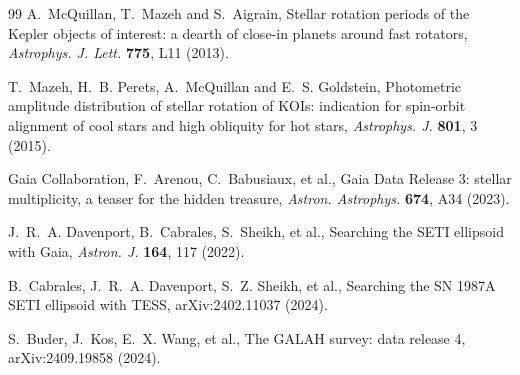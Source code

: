 \documentclass[3p,11pt]{elsarticle}
\begin{document}
\begin{thebibliography}{99}
A.~McQuillan, T.~Mazeh and S.~Aigrain, Stellar rotation periods of the Kepler objects of
interest: a dearth of close-in planets around fast rotators, \emph{Astrophys. J. Lett.}
\textbf{775}, L11 (2013).

T.~Mazeh, H.~B. Perets, A.~McQuillan and E.~S. Goldstein, Photometric amplitude
distribution of stellar rotation of KOIs: indication for spin-orbit alignment of cool
stars and high obliquity for hot stars, \emph{Astrophys. J.} \textbf{801}, 3 (2015).

Gaia Collaboration, F.~Arenou, C.~Babusiaux, et al., Gaia Data Release 3: stellar
multiplicity, a teaser for the hidden treasure, \emph{Astron. Astrophys.} \textbf{674},
A34 (2023).

J.~R.~A. Davenport, B.~Cabrales, S.~Sheikh, et al., Searching the SETI ellipsoid with
Gaia, \emph{Astron. J.} \textbf{164}, 117 (2022).

B.~Cabrales, J.~R.~A. Davenport, S.~Z. Sheikh, et al., Searching the SN 1987A SETI
ellipsoid with TESS, arXiv:2402.11037 (2024).

S.~Buder, J.~Kos, E.~X. Wang, et al., The GALAH survey: data release 4,
arXiv:2409.19858 (2024).

\end{thebibliography}
\end{document}
